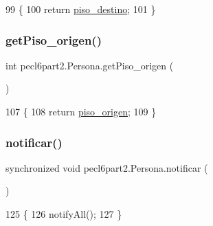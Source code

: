 \begin{DoxyCode}
99                                  \{
100         \textcolor{keywordflow}{return} \mbox{\hyperlink{classpecl6part2_1_1_persona_af4ceab86e7c49fa1416c701c21479a8b}{piso\_destino}};
101     \}
\end{DoxyCode}
\mbox{\label{classpecl6part2_1_1_persona_a79b79dc6c0c6e0c1ef89f67a4f59fec2}} 
\subsubsection{\texorpdfstring{get\+Piso\+\_\+origen()}{getPiso\_origen()}}
{\footnotesize\ttfamily int pecl6part2.\+Persona.\+get\+Piso\+\_\+origen (\begin{DoxyParamCaption}{ }\end{DoxyParamCaption})\hspace{0.3cm}{\ttfamily [inline]}}


\begin{DoxyCode}
107                                 \{
108         \textcolor{keywordflow}{return} \mbox{\hyperlink{classpecl6part2_1_1_persona_a64acff116f7c56e347369ec54c9109ad}{piso\_origen}};
109     \}
\end{DoxyCode}
\mbox{\label{classpecl6part2_1_1_persona_aeb2c3dfeddf1a677bc043f05febc8839}} 
\subsubsection{\texorpdfstring{notificar()}{notificar()}}
{\footnotesize\ttfamily synchronized void pecl6part2.\+Persona.\+notificar (\begin{DoxyParamCaption}{ }\end{DoxyParamCaption})\hspace{0.3cm}{\ttfamily [inline]}}


\begin{DoxyCode}
125     \{
126         notifyAll();
127     \}
\end{DoxyCode}
\mbox{\label{classpecl6part2_1_1_persona_ac818695ca21e23927cf0390139e5ca24}} 
